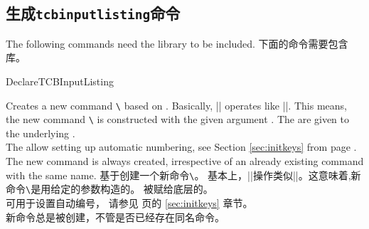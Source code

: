 \subsection{生成\texttt{tcbinputlisting}命令}\label{subsec:xparse_inputlisting}
\begin{marker}
\begin{stripedbox}
The following commands need the  library to be included.
\tcblower
下面的命令需要包含库。
\end{stripedbox}
\end{marker}


\begin{docCommand}{DeclareTCBInputListing}{}
\begin{stripedbox}
Creates a new command \texttt{\textbackslash} based on .
Basically, |\DeclareTCBInputListing| operates like |\DeclareDocumentCommand|. This means,
the new command \texttt{\textbackslash} is constructed with the given argument .
The  are given to the underlying .\\
The  allow setting up automatic numbering,
see Section \ref{sec:initkeys} from page \pageref{sec:initkeys}.\\
The new command is always created, irrespective of an already existing
command with the same name.
\tcblower
基于创建一个新命令\texttt{\textbackslash}。%
基本上，|\DeclareTCBInputListing|操作类似|\DeclareDocumentCommand|。这意味着,新命令\texttt{\textbackslash}是用给定的参数构造的。%
被赋给底层的。\\%
可用于设置自动编号，
请参见 \pageref{sec:initkeys} 页的 \ref{sec:initkeys} 章节。\\
新命令总是被创建，不管是否已经存在同名命令。
\end{stripedbox}

\begin{dispExample}

\end{dispExample}
  \end{docCommand}


